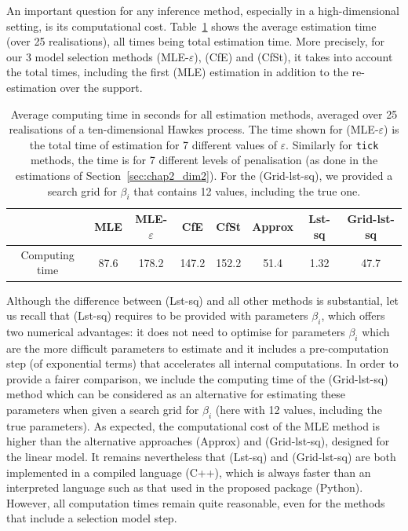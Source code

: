 An important question for any inference method, especially in a high-dimensional setting, is its computational cost. Table~\ref{tab:chap2_times_10} shows the average estimation time (over 25 realisations), all times being total estimation time. More precisely, for our 3 model selection methods (MLE-$\varepsilon$), (CfE) and (CfSt), it takes into account the total times, including the first (MLE) estimation in addition to the re-estimation over the support. 

\begin{table}[!ht] 
    \begin{center}
    \setlength{\tabcolsep}{2pt}
    \centering
    \begin{tabular}{c|c|ccc|c|cc}
          & MLE & MLE-$\varepsilon$ & CfE & CfSt & Approx & Lst-sq & Grid-lst-sq\\
         \toprule
         Computing time & 87.6 & 178.2 & 147.2 & 152.2 & 51.4 & 1.32 & 47.7
    \end{tabular}
    \caption{Average computing time in seconds for all estimation methods, averaged over 25 realisations of a ten-dimensional Hawkes process.  The time shown for (MLE-$\varepsilon$) is the total time of estimation for 7 different values of $\varepsilon$. Similarly for \texttt{tick} methods, the time is for 7 different levels of penalisation (as done in the estimations of Section~\ref{sec:chap2_dim2}). For the (Grid-lst-sq), we provided a search grid for $\beta_i$ that contains 12 values, including the true one.}
    \label{tab:chap2_times_10}
    \end{center}
    \end{table}

Although the difference between (Lst-sq) and all other methods is substantial, let us recall that (Lst-sq) requires to be provided with parameters $\beta_i$, which offers two numerical advantages: it does not need to optimise for parameters $\beta_i$ which are the more difficult parameters to estimate and it includes a pre-computation step (of exponential terms) that accelerates all internal computations. In order to provide a fairer comparison, we include the computing time of the (Grid-lst-sq) method which can be considered as an alternative for estimating these parameters when given a search grid for $\beta_i$ (here with 12 values, including the true parameters).
As expected, the computational cost of the MLE method is higher than the alternative approaches (Approx) and (Grid-lst-sq), designed for the linear model.
It remains nevertheless that (Lst-sq) and (Grid-lst-sq) are both implemented in a compiled language (C++), which is always faster than an interpreted language such as that used in the proposed package (Python).
However, all computation times remain quite reasonable, even for the methods that include a selection model step. 

